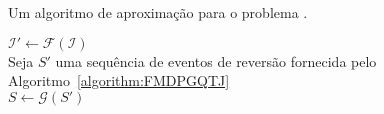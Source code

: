 \begin{algorithm}[!tbh]
  \caption{Um algoritmo de aproximação para o problema \SbIRTMI{}.\label{algorithm:LCTCOSWM}}
  $\mathcal{I'} \gets \mathcal{F}(\mathcal{I})$ \\
  Seja $S'$ uma sequência de eventos de reversão fornecida pelo Algoritmo~\ref{algorithm:FMDPGQTJ} \\
  $S\gets \mathcal{G}(S')$ \\
\end{algorithm}